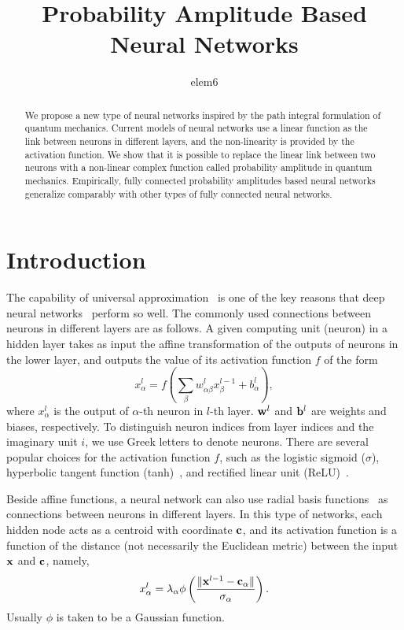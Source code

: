 \documentclass{article}
\title{Probability Amplitude Based Neural Networks}
\author{elem6}
\date{}
\begin{document}
\maketitle
\begin{abstract}
  We propose a new type of neural networks inspired by the path integral
  formulation of quantum mechanics. Current models of neural networks use a
  linear function as the link between neurons in different layers, and the
  non-linearity is provided by the activation function. We show that it is
  possible to replace the linear link between two neurons with a non-linear
  complex function called probability amplitude in quantum
  mechanics. Empirically, fully connected probability amplitudes based
  neural networks generalize comparably with other types of fully connected
  neural networks.
\end{abstract}

\section{Introduction}

The capability of universal approximation~\cite{cybenko, hornik, leshno,
  sonoda} is one of the key reasons that deep neural
networks~\cite{deeplearning} perform so well. The commonly used connections
between neurons in different layers are as follows. A given computing unit
(neuron) in a hidden layer takes as input the affine transformation of the
outputs of neurons in the lower layer, and outputs the value of its
activation function \(f\) of the form
\begin{equation}
  \label{eq:affine}
  x^{l}_{\alpha} = f\left(\sum_{\beta} w^{l}_{\alpha\beta}x^{l-1}_{\beta} + b^{l}_{\alpha}\right),
\end{equation}
where \(x^{l}_{\alpha}\) is the output of \(\alpha\)-th neuron in \(l\)-th
layer. \({\bf w}^{l}\) and \({\bf b}^{l}\) are weights and biases,
respectively. To distinguish neuron indices from layer indices and the
imaginary unit \(i\), we use Greek letters to denote neurons. There are
several popular choices for the activation function \(f\), such as the
logistic sigmoid (\(\sigma\)), hyperbolic tangent function
(tanh)~\cite{tanh}, and rectified linear unit (ReLU)~\cite{relu,
  deep_sparse}. 

Beside affine functions, a neural network can also use radial basis
functions~\cite{broomhead, park} as connections between neurons in different
layers. In this type of networks, each hidden node acts as a centroid with
coordinate \(\bf c\), and its activation function is a function of the
distance (not necessarily the Euclidean metric) between the input \(\bf x\)
and \(\bf c\), namely,
\begin{equation}
  \label{eq:rbf}
  x_{\alpha}^{l} = \lambda_{\alpha}\phi\left(\frac{\|{\bf x}^{l-1} - {\bf c}_{\alpha}\|}{\sigma_{\alpha}}\right).
\end{equation}
Usually \(\phi\) is taken to be a Gaussian function.
\end{document}
